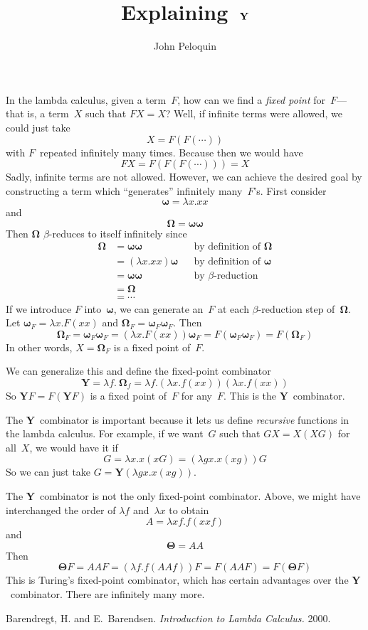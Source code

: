 \documentclass[letterpaper,12pt]{article}
\title{Explaining~\(\Y\)}
\author{John Peloquin}
\date{}
\newcommand{\Y}{\mathbf{Y}}
\newcommand{\om}{\mathbf{\omega}}
\newcommand{\Om}{\mathbf{\Omega}}
\newcommand{\Th}{\mathbf{\Theta}}
\begin{document}
\maketitle

\noindent In the lambda calculus, given a term~\(F\), how can we find a \emph{fixed point} for~\(F\)---that is, a term~\(X\) such that \(FX=X\)? Well, if infinite terms were allowed, we could just take
\[X=F(F(\cdots))\]
with \(F\)~repeated infinitely many times. Because then we would have
\[FX=F(F(F(\cdots)))=X\]
Sadly, infinite terms are not allowed. However, we can achieve the desired goal by constructing a term which ``generates'' infinitely many~\(F\)'s. First consider
\[\om=\lambda x.xx\]
and
\[\Om=\om\om\]
Then \(\Om\) \(\beta\)-reduces to itself infinitely since
\begin{align*}
\Om&=\om\om&&\text{by definition of }\Om\\
	&=(\lambda x.xx)\om&&\text{by definition of }\om\\
	&=\om\om&&\text{by }\beta\text{-reduction}\\
	&=\Om&&\\
	&=\cdots&&
\end{align*}
If we introduce \(F\) into~\(\om\), we can generate an~\(F\) at each \(\beta\)-reduction step of~\(\Om\). Let \(\om_F=\lambda x.F(xx)\) and \(\Om_F=\om_F\om_F\). Then
\[\Om_F=\om_F\om_F=(\lambda x.F(xx))\om_F=F(\om_F\om_F)=F(\Om_F)\]
In other words, \(X=\Om_F\) is a fixed point of~\(F\).

We can generalize this and define the fixed-point combinator
\[\Y=\lambda f.\ \Om_f=\lambda f.(\lambda x.f(xx))(\lambda x.f(xx))\]
So \(\Y F=F(\Y F)\) is a fixed point of~\(F\) for any~\(F\). This is the \(\Y\)~combinator.

The \(\Y\)~combinator is important because it lets us define \emph{recursive} functions in the lambda calculus. For example, if we want~\(G\) such that \(GX=X(XG)\) for all~\(X\), we would have it if
\[G=\lambda x.x(xG)=(\lambda gx.x(xg))G\]
So we can just take \(G=\Y(\lambda gx.x(xg))\).

The \(\Y\)~combinator is not the only fixed-point combinator. Above, we might have interchanged the order of \(\lambda f\) and~\(\lambda x\) to obtain
\[A=\lambda xf.f(xxf)\]
and
\[\Th=AA\]
Then
\[\Th F=AAF=(\lambda f.f(AAf))F=F(AAF)=F(\Th F)\]
This is Turing's fixed-point combinator, which has certain advantages over the \(\Y\)~combinator. There are infinitely many more.
\begin{thebibliography}{0}
 Barendregt, H. and E.~Barendsen. \textit{Introduction to Lambda Calculus.} 2000.
\end{thebibliography}
\end{document}

